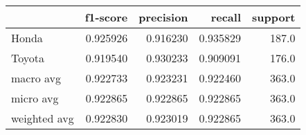 \begin{tabular}{lrrrr}
\toprule
{} &  f1-score &  precision &    recall &  support \\
\midrule
Honda        &  0.925926 &   0.916230 &  0.935829 &    187.0 \\
Toyota       &  0.919540 &   0.930233 &  0.909091 &    176.0 \\
macro avg    &  0.922733 &   0.923231 &  0.922460 &    363.0 \\
micro avg    &  0.922865 &   0.922865 &  0.922865 &    363.0 \\
weighted avg &  0.922830 &   0.923019 &  0.922865 &    363.0 \\
\bottomrule
\end{tabular}
